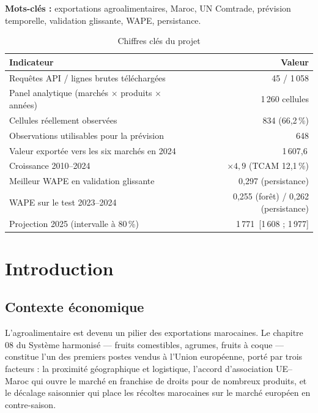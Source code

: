 \documentclass[11pt,a4paper]{article}
\newcommand{\MUSD}{\,\text{M USD}}
\begin{document}
\vspace{0.6em}
\noindent\textbf{Mots-clés :} exportations agroalimentaires, Maroc, UN Comtrade,
prévision temporelle, validation glissante, WAPE, persistance.

\begin{table}[H]
\centering
\caption{Chiffres clés du projet}\label{tab:chiffres}
\begin{tabular}{lr}
\toprule
Indicateur & Valeur \\
\midrule
Requêtes API / lignes brutes téléchargées & 45 / 1\,058 \\
Panel analytique (marchés $\times$ produits $\times$ années) & 1\,260 cellules \\
Cellules réellement observées & 834 (66,2\,\%) \\
Observations utilisables pour la prévision & 648 \\
Valeur exportée vers les six marchés en 2024 & 1\,607,6\MUSD \\
Croissance 2010--2024 & $\times 4,9$ (TCAM 12,1\,\%) \\
Meilleur WAPE en validation glissante & 0,297 (persistance) \\
WAPE sur le test 2023--2024 & 0,255 (forêt) / 0,262 (persistance) \\
Projection 2025 (intervalle à 80\,\%) & 1\,771\MUSD{} [1\,608 ; 1\,977] \\
\bottomrule
\end{tabular}
\end{table}

\newpage
\tableofcontents
\newpage

\section{Introduction}\label{sec:intro}

\subsection{Contexte économique}

L'agroalimentaire est devenu un pilier des exportations marocaines. Le chapitre 08
du Système harmonisé --- fruits comestibles, agrumes, fruits à coque --- constitue
l'un des premiers postes vendus à l'Union européenne, porté par trois facteurs :
la proximité géographique et logistique, l'accord d'association UE--Maroc qui
ouvre le marché en franchise de droits pour de nombreux produits, et le
décalage saisonnier qui place les récoltes marocaines sur le marché européen en
contre-saison.
\end{document}
